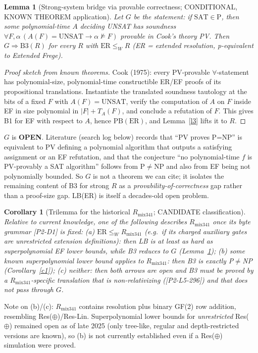 \documentclass[11pt]{article}
\newtheorem{lemma}{Lemma}
\newtheorem{corollary}{Corollary}
\theoremstyle{definition}
\begin{document}
\begin{lemma}[Strong-system bridge via provable correctness; CONDITIONAL, KNOWN THEOREM application]\label{l4}
Let $G$ be the statement: \emph{if $\mathrm{SAT}\in\mathrm P$, then some polynomial-time $A$
deciding UNSAT has soundness $\forall F,\alpha\,(A(F){=}\mathrm{UNSAT}\to\alpha\not\models F)$
provable in Cook's theory PV.} Then $G\Rightarrow\mathrm{B3}(R)$ for every $R$ with
$\mathrm{ER}\le_W R$ (ER = extended resolution, p-equivalent to Extended Frege).
\end{lemma}
\begin{proof}[Proof sketch from known theorems]
Cook (1975): every PV-provable $\forall$-statement has polynomial-size, polynomial-time
constructible ER/EF proofs of its propositional translations. Instantiate the
translated soundness tautology at the bits of a fixed $F$ with $A(F)=\mathrm{UNSAT}$,
verify the computation of $A$ on $F$ inside EF in size polynomial in $|F|+T_A(F)$, and
conclude a refutation of $F$. This gives B1 for EF with respect to $A$, hence
$\mathrm{PB}(\mathrm{ER})$, and Lemma~\ref{l3} lifts it to $R$.
\end{proof}
\noindent $G$ is \textbf{OPEN}. Literature (search log below) records that
``PV proves P=NP'' is equivalent to PV defining a polynomial algorithm that outputs a
satisfying assignment or an EF refutation, and that the conjecture ``no
polynomial-time $f$ is PV-provably a SAT algorithm'' follows from P$\ne$NP and
also from EF being not polynomially bounded. So $G$ is not a theorem we can cite;
it isolates the remaining content of B3 for strong $R$ as a \emph{provability-of-correctness}
gap rather than a proof-size gap. LB(ER) is itself a decades-old open problem.

\begin{corollary}[Trilemma for the historical $R_{\mathrm{mix341}}$; CANDIDATE classification]
Relative to current knowledge, one of the following describes $R_{\mathrm{mix341}}$ once its byte grammar
[P2-D1] is fixed: (a) $\mathrm{ER}\le_W R_{\mathrm{mix341}}$ (e.g.\ if its charged
auxiliary gates are unrestricted extension definitions): then LB is at least as
hard as superpolynomial EF lower bounds, while B3 reduces to $G$ (Lemma~\ref{l4});
(b) some known superpolynomial lower bound applies to $R_{\mathrm{mix341}}$: then
B3 is exactly P$\ne$NP (Corollary~\ref{c1}); (c) neither: then both arrows are open
and B3 must be proved by a $R_{\mathrm{mix341}}$-specific translation that is
non-relativizing ([P2-L5-296]) and that does not pass through $G$.
\end{corollary}
\noindent Note on (b)/(c): $R_{\mathrm{mix341}}$ contains resolution plus binary
GF(2) row addition, resembling Res($\oplus$)/Res-Lin. Superpolynomial lower bounds for
\emph{unrestricted} Res($\oplus$) remained open as of late 2025 (only tree-like,
regular and depth-restricted versions are known), so (b) is not currently
established even if a Res($\oplus$) simulation were proved.
\end{document}

